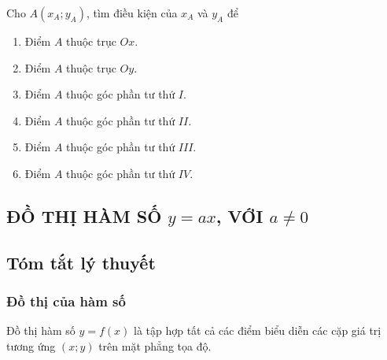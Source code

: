 \begin{bt}%
Cho $ A\left(x_A;y_A \right) $, tìm điều kiện của $ x_A $ và $ y_A $ để
\begin{enumerate}
	\item Điểm $ A $ thuộc trục $ Ox. $
	\item Điểm $ A $ thuộc trục $ Oy. $
	\item Điểm $ A $ thuộc góc phần tư thứ $ I. $
	\item Điểm $ A $ thuộc góc phần tư thứ $ II. $
	\item Điểm $ A $ thuộc góc phần tư thứ $ III. $
	\item Điểm $ A $ thuộc góc phần tư thứ $ IV. $
\end{enumerate}
\end{bt}
\begin{center}
	\section{ĐỒ THỊ HÀM SỐ  $ y = ax $, VỚI  $ a \ne 0 $}
\end{center} 
\subsection{Tóm tắt lý thuyết}
\subsubsection{Đồ thị của hàm số}
Đồ thị hàm số $ y = f(x) $ là tập hợp tất cả các điểm biểu diễn các cặp giá trị tương ứng $ \left( x; y \right) $ trên mặt phẳng tọa độ.
